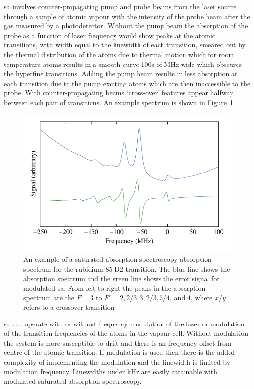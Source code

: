 \Gls{sa} involves counter-propagating pump and probe beams from the laser source through a sample of atomic vapour with the intensity of the probe beam after the gas measured by a photodetector.
Without the pump beam the absorption of the probe as a function of laser frequency would show peaks at the atomic transitions, with width equal to the linewidth of each transition, smeared out by the thermal distribution of the atoms due to thermal motion which for room temperature atoms results in a smooth curve 100s of MHz wide which obscures the hyperfine transitions.
Adding the pump beam results in less absorption at each transition due to the pump exciting atoms which are then inaccessible to the probe. With counter-propagating beams `cross-over' features appear halfway between each pair of transitions.
An example spectrum is shown in Figure~\ref{figure:satabsspectrum}

\begin{figure}
    \center
    \includegraphics{part1/Figs/SatAbsSpectrum.pdf}
    \caption{An example of a saturated absorption spectroscopy absorption spectrum for the rubidium-85 D2 transition.
    The blue line shows the absorption spectrum and the green line shows the error signal for modulated \gls{sa}.
    From left to right the peaks in the absorption spectrum are the $F=3$ to $F'=2,2/3,3,2/3,3/4$, and $4$, where $x/y$ refers to a crossover transition.}
    \label{figure:satabsspectrum}
\end{figure}

\Gls{sa} can operate with or without frequency modulation of the laser or modulation of the transition frequencies of the atoms in the vapour cell.
Without modulation the system is more susceptible to drift and there is an frequency offset from centre of the atomic transition.
If modulation is used then there is the added complexity of implementing the modulation and the linewidth is limited by modulation frequency.
Linewidths under \unit[150]{kHz} are easily attainable with modulated saturated absorption spectroscopy.

